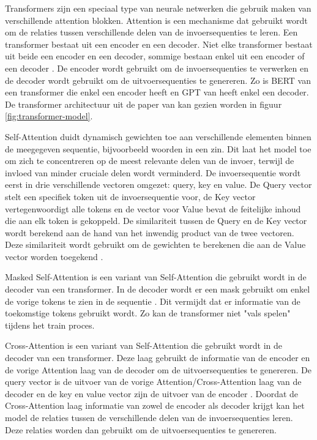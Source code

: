 Transformers zijn een speciaal type van neurale netwerken die gebruik maken van verschillende attention blokken.
Attention is een mechanisme dat gebruikt wordt om de relaties tussen verschillende delen van de invoersequenties te leren.
Een transformer bestaat uit een encoder en een decoder. 
Niet elke transformer bestaat uit beide een encoder en een decoder, sommige bestaan enkel uit een encoder of een decoder \autocite{Hoque2023}.
De encoder wordt gebruikt om de invoersequenties te verwerken en de decoder wordt gebruikt om de uitvoersequenties te genereren.
Zo is BERT van \textcite{DevlinEtAl2019} een transformer die enkel een encoder heeft en GPT van \textcite{RandfordEtAL2018} heeft enkel een decoder.
De transformer architectuur uit de paper van \textcite{VaswaniEtAl2017} kan gezien worden in figuur \ref{fig:transformer-model}. 

Self-Attention duidt dynamisch gewichten toe aan verschillende elementen binnen de meegegeven sequentie, bijvoorbeeld woorden in een zin.
Dit laat het model toe om zich te concentreren op de meest relevante delen van de invoer, terwijl de invloed van minder cruciale delen wordt verminderd.
De invoersequentie wordt eerst in drie verschillende vectoren omgezet: query, key en value.
De Query vector stelt een specifiek token uit de invoersequentie voor, de Key vector vertegenwoordigt alle tokens en de vector voor Value bevat de feitelijke inhoud die aan elk token is gekoppeld.
De similariteit tussen de Query en de Key vector wordt berekend aan de hand van het inwendig product van de twee vectoren.
Deze similariteit wordt gebruikt om de gewichten te berekenen die aan de Value vector worden toegekend \autocite{VaswaniEtAl2017}.

Masked Self-Attention is een variant van Self-Attention die gebruikt wordt in de decoder van een transformer.
In de decoder wordt er een mask gebruikt om enkel de vorige tokens te zien in de sequentie \autocite{VaswaniEtAl2017}.
Dit vermijdt dat er informatie van de toekomstige tokens gebruikt wordt. 
Zo kan de transformer niet "vals spelen" tijdens het train proces.

Cross-Attention is een variant van Self-Attention die gebruikt wordt in de decoder van een transformer.
Deze laag gebruikt de informatie van de encoder en de vorige Attention laag van de decoder om de uitvoersequenties te genereren.
De query vector is de uitvoer van de vorige Attention/Cross-Attention laag van de decoder en de key en value vector zijn de uitvoer van de encoder \autocite{VaswaniEtAl2017}.
Doordat de Cross-Attention laag informatie van zowel de encoder als decoder krijgt kan het model de relaties tussen de verschillende delen van de invoersequenties leren.
Deze relaties worden dan gebruikt om de uitvoersequenties te genereren.

